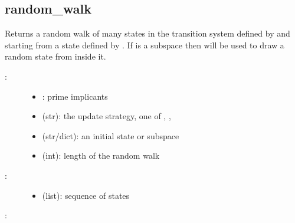 \documentclass[letterpaper,10pt,english]{sphinxmanual}
\begin{document}
\subsection{random\_walk}
\label{\detokenize{StateTransitionGraphs:id6}}\label{\detokenize{StateTransitionGraphs:random-walk}}

\begin{fulllineitems}
\label{\detokenize{StateTransitionGraphs:PyBoolNet.StateTransitionGraphs.random_walk}}
Returns a random walk of  many states in the transition system defined by  and 
starting from a state defined by .
If  is a subspace then {\hyperref[\detokenize{StateTransitionGraphs:random-state}]{}} will be used to draw a random state from inside it.
\begin{description}
\item[{:}] \leavevmode\begin{itemize}
\item {} 
: prime implicants

\item {} 
 (str): the update strategy, one of , , 

\item {} 
 (str/dict): an initial state or subspace

\item {} 
 (int): length of the random walk

\end{itemize}

\item[{:}] \leavevmode\begin{itemize}
\item {} 
 (list): sequence of states

\end{itemize}

\end{description}

:

\begin{sphinxVerbatim}[commandchars=\\\{\}]
     
\end{sphinxVerbatim}

\end{fulllineitems}
\end{document}
